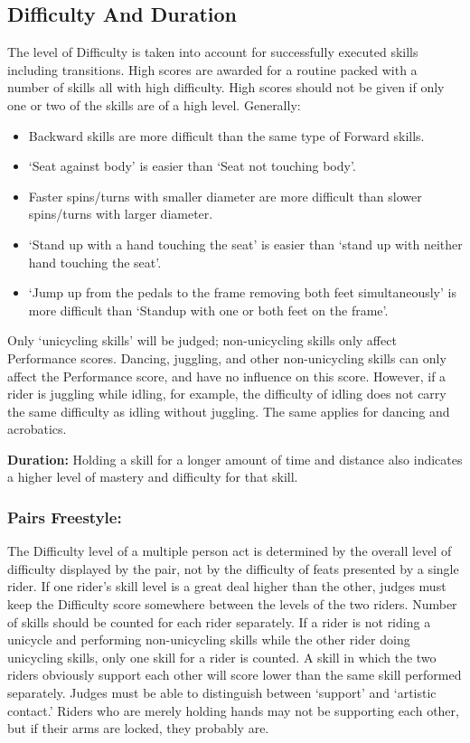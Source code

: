 \subsection{Difficulty And Duration}
The level of Difficulty is taken into account for successfully executed skills including transitions.
High scores are awarded for a routine packed with a number of skills all with high difficulty.
High scores should not be given if only one or two of the skills are of a high level.
Generally:
\begin{itemize}
\item Backward skills are more difficult than the same type of Forward skills.
\item `Seat against body' is easier than `Seat not touching body'.
\item Faster spins/turns with smaller diameter are more difficult than slower spins/turns with larger diameter.
\item `Stand up with a hand touching the seat' is easier than `stand up with neither hand touching the seat'.
\item `Jump up from the pedals to the frame removing both feet simultaneously' is more difficult than `Standup with one or both feet on the frame'.
\end{itemize}
Only `unicycling skills' will be judged; non-unicycling skills only affect Performance scores.
Dancing, juggling, and other non-unicycling skills can only affect the Performance score, and have no influence on this score.
However, if a rider is juggling while idling, for example, the difficulty of idling does not carry the same difficulty as idling without juggling.
The same applies for dancing and acrobatics.

\textbf{Duration:} Holding a skill for a longer amount of time and distance also indicates a higher level of mastery and difficulty for that skill.

\subsubsection{Pairs Freestyle:}
The Difficulty level of a multiple person act is determined by the overall level of difficulty displayed by the pair, not by the difficulty of feats presented by a single rider.
If one rider's skill level is a great deal higher than the other, judges must keep the Difficulty score somewhere between the levels of the two riders.
Number of skills should be counted for each rider separately.
If a rider is not riding a unicycle and performing non-unicycling skills while the other rider doing unicycling skills, only one skill for a rider is counted.
A skill in which the two riders obviously support each other will score lower than the same skill performed separately.
Judges must be able to distinguish between `support' and `artistic contact.' Riders who are merely holding hands may not be supporting each other, but if their arms are locked, they probably are.

